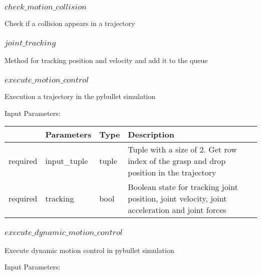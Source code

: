 \documentclass[
	ngerman,
	accentcolor=9c,%
	type=intern,
	marginpar=false
	]{tudapub}
\begin{document}
\vspace{1cm}

\subsubsection{$check\_motion\_collision$}
\noindent Check if a collision appears in a trajectory

\vspace{1cm}

\subsubsection{$joint\_tracking$}
\noindent Method for tracking position and velocity and add it to the queue

\vspace{1cm}



\subsubsection{$execute\_motion\_control$}
\noindent Execution a trajectory in the pybullet simulation

\vspace{0.5cm}
\noindent Input Parameters:
\vspace{0.5cm}

\begin{tabular}{|p{}|p{}|p{}| p{}|}
\hline
 & \textbf{Parameters} & \textbf{Type} & \textbf{Description} \\
\hline
required & input\_tuple & tuple &    Tuple with a size of 2. Get row index of the grasp and drop position in the trajectory\\
\hline
required & tracking & bool & Boolean state for tracking joint position, joint velocity, joint acceleration and joint forces\\
\hline
\end{tabular}
\vspace{1cm}


\subsubsection{$execute\_dynamic\_motion\_control$}
\noindent Execute dynamic motion control in pybullet simulation

\vspace{0.5cm}
\noindent Input Parameters:
\vspace{0.5cm}
\end{document}
